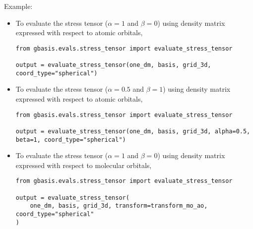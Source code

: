 \documentclass[letterpaper]{article}
\begin{document}
Example:
\begin{itemize}
\item To evaluate the stress tensor ($\alpha=1$ and $\beta=0$)
  using density matrix expressed with respect to atomic orbitals,
  \begin{lstlisting}[xleftmargin=-25pt]
from gbasis.evals.stress_tensor import evaluate_stress_tensor

output = evaluate_stress_tensor(one_dm, basis, grid_3d, coord_type="spherical")
\end{lstlisting}
\item To evaluate the stress tensor ($\alpha=0.5$ and $\beta=1$)
  using density matrix expressed with respect to atomic orbitals,
  \begin{lstlisting}[xleftmargin=-25pt]
from gbasis.evals.stress_tensor import evaluate_stress_tensor

output = evaluate_stress_tensor(one_dm, basis, grid_3d, alpha=0.5, beta=1, coord_type="spherical")
\end{lstlisting}
\item To evaluate the stress tensor ($\alpha=1$ and $\beta=0$)
  using density matrix expressed with respect to molecular orbitals,
  \begin{lstlisting}[xleftmargin=-25pt]
from gbasis.evals.stress_tensor import evaluate_stress_tensor

output = evaluate_stress_tensor(
    one_dm, basis, grid_3d, transform=transform_mo_ao, coord_type="spherical"
)
\end{lstlisting}
\end{itemize}
\end{document}
